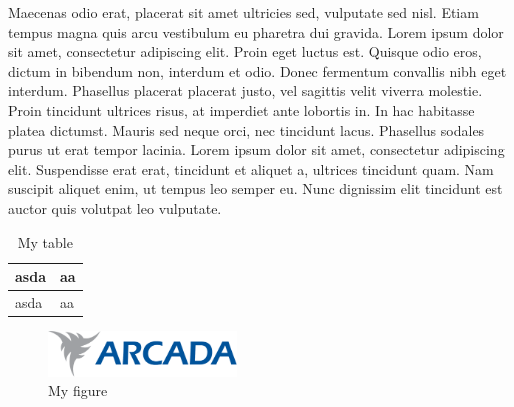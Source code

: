 \documentclass[twoside,emptyfirstpagenumber,swedish]{../thesis}
\begin{document}
\cite{website:zoompfcdns} Maecenas odio erat, placerat sit amet \cite{test}ultricies sed, vulputate sed nisl. Etiam tempus magna quis arcu vestibulum eu pharetra dui gravida. Lorem ipsum dolor sit amet, consectetur adipiscing elit. Proin eget luctus est. Quisque odio eros, dictum in bibendum non, interdum et odio. Donec fermentum convallis nibh eget interdum. Phasellus placerat placerat justo, vel sagittis velit viverra molestie. Proin tincidunt ultrices risus, at imperdiet ante lobortis in. In hac habitasse platea dictumst. Mauris sed neque orci, nec tincidunt lacus. Phasellus sodales purus ut erat tempor lacinia. Lorem ipsum dolor sit amet, consectetur adipiscing elit. Suspendisse erat erat, tincidunt et aliquet a, ultrices tincidunt quam. Nam suscipit aliquet enim, ut tempus leo semper eu. Nunc dignissim elit tincidunt est auctor quis volutpat leo vulputate.

\begin{table}[ht]
  \begin{tabular}{ | l | p{2cm} | }
    \hline
    asda & aa \\ \hline
    asda & aa \\ \hline
  \end{tabular}
  \caption{My table}
  \label{tab:myfirsttable}
\end{table}

\begin{figure}[ht]
  \caption{My figure}
  \includegraphics[width=5cm]{logo.pdf}
\end{figure}




\end{document}
